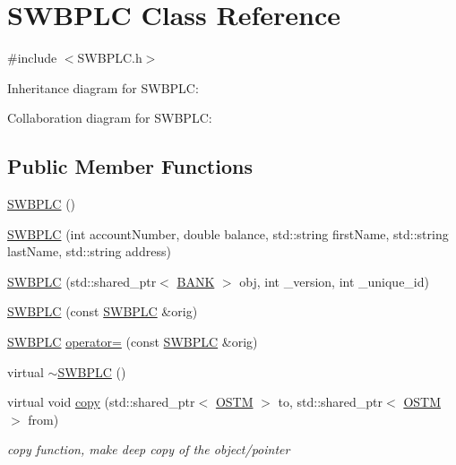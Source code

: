 \hypertarget{class_s_w_b_p_l_c}{}\section{S\+W\+B\+P\+LC Class Reference}
\label{class_s_w_b_p_l_c}


{\ttfamily \#include $<$S\+W\+B\+P\+L\+C.\+h$>$}



Inheritance diagram for S\+W\+B\+P\+LC\+:


Collaboration diagram for S\+W\+B\+P\+LC\+:
\subsection*{Public Member Functions}
\begin{DoxyCompactItemize}
\item 
\hyperlink{class_s_w_b_p_l_c_a320f4e2b023038668d941ce5d0c46aeb}{S\+W\+B\+P\+LC} ()
\item 
\hyperlink{class_s_w_b_p_l_c_a29c408f7ccb7c5962dab8ac858758a89}{S\+W\+B\+P\+LC} (int account\+Number, double balance, std\+::string first\+Name, std\+::string last\+Name, std\+::string address)
\item 
\hyperlink{class_s_w_b_p_l_c_a33e460bff6f51b30209a6f5a25a24d7d}{S\+W\+B\+P\+LC} (std\+::shared\+\_\+ptr$<$ \hyperlink{class_b_a_n_k}{B\+A\+NK} $>$ obj, int \+\_\+version, int \+\_\+unique\+\_\+id)
\item 
\hyperlink{class_s_w_b_p_l_c_a767c6ae2b15f523b5ec6e35e137dcc96}{S\+W\+B\+P\+LC} (const \hyperlink{class_s_w_b_p_l_c}{S\+W\+B\+P\+LC} \&orig)
\item 
\hyperlink{class_s_w_b_p_l_c}{S\+W\+B\+P\+LC} \hyperlink{class_s_w_b_p_l_c_a1e4b8f85d4e8e29429d691e258fea2e7}{operator=} (const \hyperlink{class_s_w_b_p_l_c}{S\+W\+B\+P\+LC} \&orig)
\item 
virtual \hyperlink{class_s_w_b_p_l_c_a5d6f00a76145f32424ff6db9ac23c6fe}{$\sim$\+S\+W\+B\+P\+LC} ()
\item 
virtual void \hyperlink{class_s_w_b_p_l_c_a9468640482a6cfb9bfb4115fc59191d5}{copy} (std\+::shared\+\_\+ptr$<$ \hyperlink{class_o_s_t_m}{O\+S\+TM} $>$ to, std\+::shared\+\_\+ptr$<$ \hyperlink{class_o_s_t_m}{O\+S\+TM} $>$ from)
\begin{DoxyCompactList}\small\item\em copy function, make deep copy of the object/pointer \end{DoxyCompactList}\item 

\end{DoxyCompactItemize}
